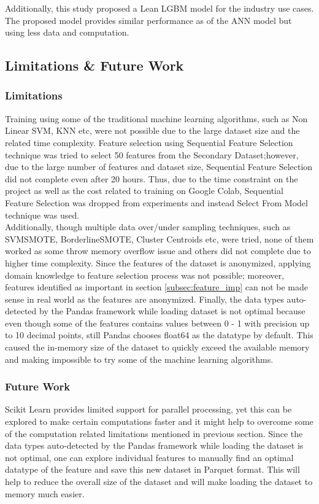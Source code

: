 \documentclass[twoside,11pt,a4paper]{article}
\begin{document}
Additionally, this study proposed a Lean \acs{LGBM} model for the industry use cases. The proposed model provides similar performance as of the \acs{ANN} model but using less data and computation.

\subsection{Limitations \& Future Work}

\subsubsection{Limitations}
Training using some of the traditional machine learning algorithms, such as Non Linear \acs{SVM}, \acf{KNN} etc, were not possible due to the large dataset size and the related time complexity. Feature selection using Sequential Feature Selection technique was tried to select 50 features from the Secondary Dataset;however, due to the large number of features and dataset size, Sequential Feature Selection did not complete even after 20 hours. Thus, due to the time constraint on the project as well as the cost related to training on Google Colab, Sequential Feature Selection was dropped from experiments and instead Select From Model technique was used.\\

Additionally, though multiple data over/under sampling techniques, such as SVMSMOTE, BorderlineSMOTE, Cluster Centroids etc,  were tried, none of them worked as some throw memory overflow issue and others did not complete due to higher time complexity. Since the features of the dataset is anonymized, applying domain knowledge to feature selection process was not possible; moreover, features identified as important in section \ref{subsec:feature_imp} can not be made sense in real world as the features are anonymized. 
Finally, the  data types auto-detected by the Pandas framework while loading dataset is not optimal because even though some of the features contains values between 0 - 1 with precision up to 10 decimal points, still Pandas chooses float64 as the datatype by default. This caused the in-memory size of the dataset to quickly exceed the available memory and making impossible to try some of the machine learning algorithms.

\subsubsection{Future Work}
Scikit Learn \citep{scikit-learn} provides limited support for parallel processing, yet this can be explored to make certain computations faster and it might help to overcome some of the computation related limitations mentioned in previous section. Since the data types auto-detected by the Pandas framework while loading the dataset is not optimal, one can explore individual features to manually find an optimal datatype of the feature and save this new dataset in Parquet format. This will help to reduce the overall size of the dataset and will make loading the dataset to memory much easier.
\end{document}
